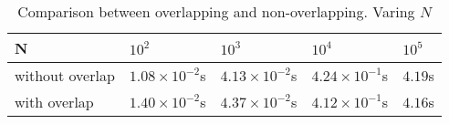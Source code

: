 \begin{table}[h]
	\centering
	\caption{Comparison between overlapping and non-overlapping. Varing $N$}
	\label{tab5}
	\begin{tabular}{lllll}
		\hline
		N               & $10^2$ & $10^3$ & $10^4$ & $10^5$ \\ \hline
		without overlap & $1.08\times10^{-2}$s & $4.13\times10^{-2}$s & $4.24\times10^{-1}$s & $4.19$s  \\ 
		with overlap    & $1.40\times10^{-2}$s & $4.37\times10^{-2}$s & $4.12\times10^{-1}$s & $4.16$s  \\ \hline
	\end{tabular}
\end{table}

